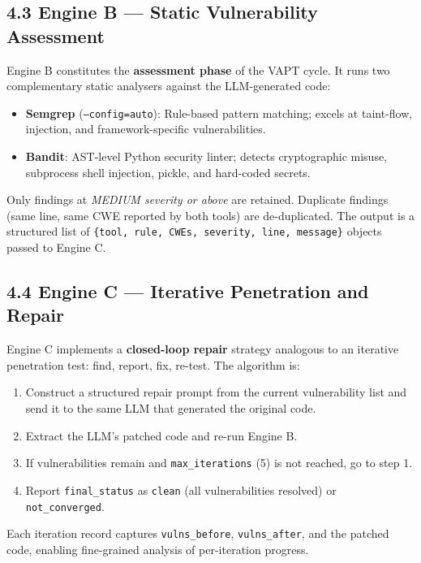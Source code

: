 \documentclass[11pt,a4paper]{article}
\begin{document}
\subsection{4.3 \enspace Engine B — Static Vulnerability Assessment}

Engine B constitutes the \textbf{assessment phase} of the VAPT cycle. It runs two complementary static analysers against the LLM-generated code:

\begin{itemize}[nosep, leftmargin=*]
  \item \textbf{Semgrep} (\texttt{--config=auto}): Rule-based pattern matching; excels at taint-flow, injection, and framework-specific vulnerabilities.
  \item \textbf{Bandit}: AST-level Python security linter; detects cryptographic misuse, subprocess shell injection, pickle, and hard-coded secrets.
\end{itemize}

Only findings at \textit{MEDIUM severity or above} are retained. Duplicate findings (same line, same CWE reported by both tools) are de-duplicated. The output is a structured list of \texttt{\{tool, rule, CWEs, severity, line, message\}} objects passed to Engine C.

\subsection{4.4 \enspace Engine C — Iterative Penetration and Repair}

Engine C implements a \textbf{closed-loop repair} strategy analogous to an iterative penetration test: find, report, fix, re-test. The algorithm is:

\begin{enumerate}[nosep, leftmargin=*]
  \item Construct a structured repair prompt from the current vulnerability list and send it to the same LLM that generated the original code.
  \item Extract the LLM's patched code and re-run Engine B.
  \item If vulnerabilities remain and \texttt{max\_iterations} (5) is not reached, go to step 1.
  \item Report \texttt{final\_status} as \texttt{clean} (all vulnerabilities resolved) or \texttt{not\_converged}.
\end{enumerate}

Each iteration record captures \texttt{vulns\_before}, \texttt{vulns\_after}, and the patched code, enabling fine-grained analysis of per-iteration progress.
\end{document}
